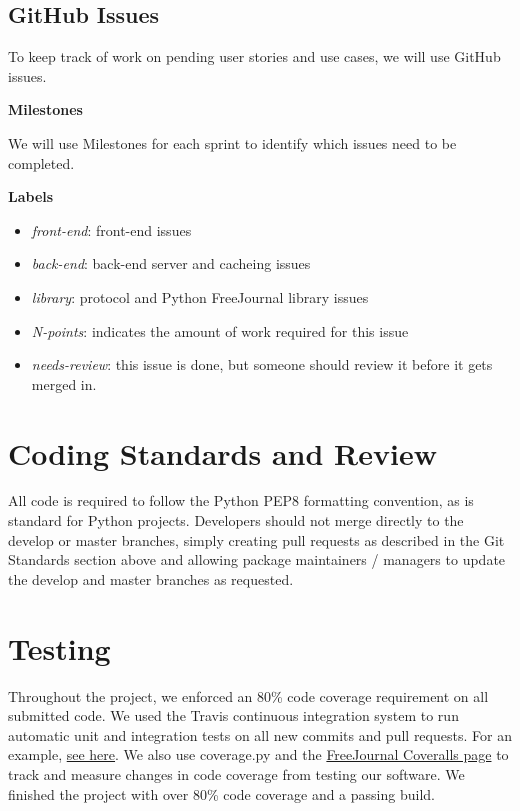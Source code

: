 \documentclass[letterpaper,10pt,oneside]{sphinxmanual}
\begin{document}
\subsection{GitHub Issues}
\label{process:github-issues}
To keep track of work on pending user stories and use cases, we will use GitHub issues.

\textbf{Milestones}

We will use Milestones for each sprint to identify which issues need to be completed.

\textbf{Labels}
\begin{itemize}
\item {} 
\emph{front-end}: front-end issues

\item {} 
\emph{back-end}: back-end server and cacheing issues

\item {} 
\emph{library}: protocol and Python FreeJournal library issues

\item {} 
\emph{N-points}: indicates the amount of work required for this issue

\item {} 
\emph{needs-review}: this issue is done, but someone should review it before it gets merged in.

\end{itemize}


\section{Coding Standards and Review}
\label{process:coding-standards-and-review}
All code is required to follow the Python PEP8 formatting convention, as is standard for Python projects.
Developers should not merge directly to the develop or master branches, simply creating pull requests as
described in the Git Standards section above and allowing package maintainers / managers to update the develop
and master branches as requested.


\section{Testing}
\label{process:testing}
Throughout the project, we enforced an 80\% code coverage requirement on all submitted code.  We used the
Travis continuous integration system to run automatic unit and integration tests on all new commits and pull
requests. For an example, \href{https://github.com/FreeJournal/freejournal/pull/118}{see here}.  We also use
coverage.py and the \href{https://coveralls.io/r/FreeJournal/freejournal?branch=develop}{FreeJournal Coveralls page} to track and measure changes in code
coverage from testing our software.  We finished the project with over 80\% code coverage and a passing build.
\end{document}
